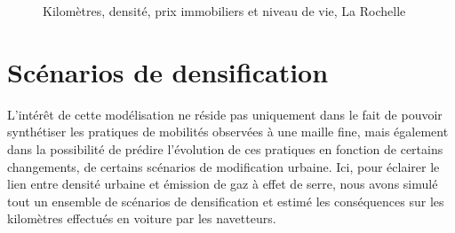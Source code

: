 \documentclass[
  9pt,
  a4paper,
  DIV=11]{scrreprt}
\begin{document}
\begin{figure}[htb]

\caption{\label{fig-prixkm}Kilomètres, densité, prix immobiliers et
niveau de vie, La Rochelle}


\end{figure}%

\section{Scénarios de
densification}\label{scuxe9narios-de-densification}

L'intérêt de cette modélisation ne réside pas uniquement dans le fait de
pouvoir synthétiser les pratiques de mobilités observées à une maille
fine, mais également dans la possibilité de prédire l'évolution de ces
pratiques en fonction de certains changements, de certains scénarios de
modification urbaine. Ici, pour éclairer le lien entre densité urbaine
et émission de gaz à effet de serre, nous avons simulé tout un ensemble
de scénarios de densification et estimé les conséquences sur les
kilomètres effectués en voiture par les navetteurs.
\end{document}
